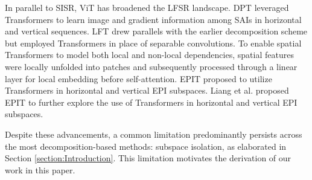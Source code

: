 In parallel to SISR, ViT has broadened the LFSR landscape. DPT \cite{wangDPT_AAAI2022} leveraged Transformers to learn image and gradient information among SAIs in horizontal and vertical sequences. LFT \cite{liangLFT_SPL2022} drew parallels with the earlier decomposition scheme but employed Transformers in place of separable convolutions. To enable spatial Transformers to model both local and non-local dependencies, spatial features were locally unfolded into patches and subsequently processed through a linear layer for local embedding before self-attention. EPIT proposed to utilize Transformers in horizontal and vertical EPI subspaces. Liang et al. proposed EPIT \cite{liangEPIT_arXiv2023} to further explore the use of Transformers in horizontal and vertical EPI subspaces. 

Despite these advancements, a common limitation predominantly persists across the most decomposition-based methods: subspace isolation, as elaborated in Section \ref*{section:Introduction}. This limitation motivates the derivation of our work in this paper.
